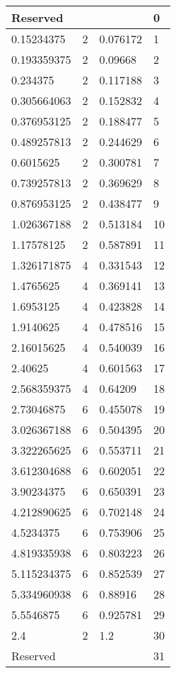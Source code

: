 \begin{longtable}{|l|l|l|l|}
\multicolumn{3}{|l|}{Reserved}  & 0 \\  \hline
    0.15234375     & 2  & 0.076172 & 1       \\ \hline
    0.193359375    & 2  & 0.09668  & 2       \\ \hline
    0.234375       & 2  & 0.117188 & 3       \\ \hline
    0.305664063    & 2  & 0.152832 & 4       \\ \hline
    0.376953125    & 2  & 0.188477 & 5       \\ \hline
    0.489257813    & 2  & 0.244629 & 6       \\ \hline
    0.6015625      & 2  & 0.300781 & 7       \\ \hline
    0.739257813    & 2  & 0.369629 & 8       \\ \hline
    0.876953125    & 2  & 0.438477 & 9       \\ \hline
    1.026367188    & 2  & 0.513184 & 10      \\ \hline
    1.17578125     & 2  & 0.587891 & 11      \\ \hline
    1.326171875    & 4  & 0.331543 & 12      \\ \hline
    1.4765625      & 4  & 0.369141 & 13      \\ \hline
    1.6953125      & 4  & 0.423828 & 14      \\ \hline
    1.9140625      & 4  & 0.478516 & 15      \\ \hline
    2.16015625     & 4  & 0.540039 & 16      \\ \hline
    2.40625        & 4  & 0.601563 & 17      \\ \hline
    2.568359375    & 4  & 0.64209  & 18      \\ \hline
    2.73046875     & 6  & 0.455078 & 19      \\ \hline
    3.026367188    & 6  & 0.504395 & 20      \\ \hline
    3.322265625    & 6  & 0.553711 & 21      \\ \hline
    3.612304688    & 6  & 0.602051 & 22      \\ \hline
    3.90234375     & 6  & 0.650391 & 23      \\ \hline
    4.212890625    & 6  & 0.702148 & 24      \\ \hline
    4.5234375      & 6  & 0.753906 & 25      \\ \hline
    4.819335938    & 6  & 0.803223 & 26      \\ \hline
    5.115234375    & 6  & 0.852539 & 27      \\ \hline
    5.334960938    & 6  & 0.88916  & 28      \\ \hline
    5.5546875      & 6  & 0.925781 & 29      \\ \hline
    2.4            & 2  & 1.2      & 30      \\ \hline
\multicolumn{3}{|l|}{Reserved}  & 31 \\  \hline
    \end{longtable}


